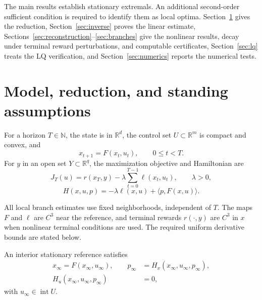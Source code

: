 \documentclass[twocolumn,nameyear,amsthm]{autart}
\newcommand{\R}{\mathbb R}
\newcommand{\Fbar}{F}
\newcommand{\xinf}{x_\infty}
\newcommand{\uinf}{u_\infty}
\newcommand{\pinf}{p_\infty}
\newcommand{\ip}[2]{\langle #1,#2\rangle}
\numberwithin{equation}{section}
\begin{document}
The main results establish stationary extremals.  An additional second-order
sufficient condition is required to identify them as local optima.
Section~\ref{sec:model} gives the reduction,
Section~\ref{sec:inverse} proves the linear estimate,
Sections~\ref{sec:reconstruction}--\ref{sec:branches} give the nonlinear
results, decay under terminal reward perturbations, and computable certificates,
Section~\ref{sec:lq} treats the LQ
verification, and Section~\ref{sec:numerics} reports the numerical tests.

\section{Model, reduction, and standing assumptions}\label{sec:model}
For a horizon $T\in\mathbb N$, the state is in $\R^d$, the control set $U\subset\R^m$ is compact and convex, and
\begin{equation}\label{eq:dynamics}
      x_{t+1}=\Fbar(x_t,u_t),\qquad 0\le t<T.
\end{equation}
For $y$ in an open set $Y\subset\R^q$, the maximization objective and Hamiltonian are
\begin{equation}\label{eq:objective}
      J_T(u)=r(x_T,y)-\lambda\sum_{t=0}^{T-1}\ell(x_t,u_t),\qquad \lambda>0,
\end{equation}
\begin{equation}\label{eq:ham}
      H(x,u,p)=-\lambda\ell(x,u)+\ip{p}{\Fbar(x,u)}.
\end{equation}

All local branch estimates use fixed neighborhoods, independent of $T$.
The maps $\Fbar$ and $\ell$ are $C^3$ near the reference, and terminal
rewards $r(\cdot,y)$ are $C^3$ in $x$ when nonlinear terminal conditions are
used.  The required uniform derivative bounds are stated below.

An interior stationary reference satisfies
\begin{equation}\label{eq:stationary}
\begin{aligned}
   \xinf=\Fbar(\xinf,\uinf),\qquad
   \pinf&=H_x(\xinf,\uinf,\pinf),\\
   H_u(\xinf,\uinf,\pinf)&=0,
\end{aligned}
\end{equation}
with $\uinf\in\operatorname{int}U$.
\end{document}
